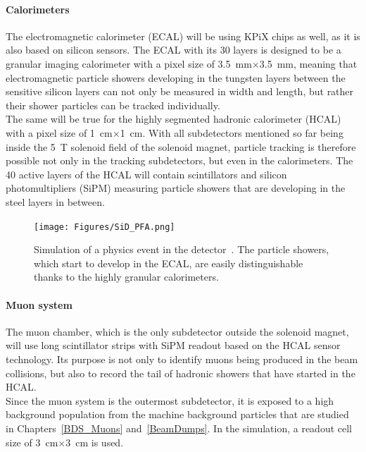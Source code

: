 \paragraph{Calorimeters}
The electromagnetic calorimeter (ECAL) will be using KPiX chips as well, as it is also based on silicon sensors.
The ECAL with its 30 layers is designed to be a granular imaging calorimeter with a pixel size of \SI{3.5}{\milli\meter}$\times$\SI{3.5}{\milli\meter}, meaning that electromagnetic particle showers developing in the tungsten layers between the sensitive silicon layers can not only be measured in width and length, but rather their shower particles can be tracked individually.
\\The same will be true for the highly segmented hadronic calorimeter (HCAL) with a pixel size of \SI{1}{\centi\meter}$\times$\SI{1}{\centi\meter}.
With all subdetectors mentioned so far being inside the \SI{5}{\tesla} solenoid field of the \sid solenoid magnet, particle tracking is therefore possible not only in the tracking subdetectors, but even in the calorimeters.
The 40 active layers of the HCAL will contain scintillators and silicon photomultipliers (SiPM) measuring particle showers that are developing in the steel layers in between.
\begin{figure}[h!]
\centering
\texttt{[image: Figures/SiD\_PFA.png]}
\caption[Visualization of the granulat \sid subdetectors]{Simulation of a physics event in the \sid detector~\cite{SiD_Update2}.
The particle showers, which start to develop in the ECAL, are easily distinguishable thanks to the highly granular calorimeters.}
\label{fig:SiD_PFA}
\end{figure}

\paragraph{Muon system}
The muon chamber, which is the only subdetector outside the solenoid magnet, will use long scintillator strips with SiPM readout based on the HCAL sensor technology.
Its purpose is not only to identify muons being produced in the beam collisions, but also to record the tail of hadronic showers that have started in the HCAL.
\\Since the muon system is the outermost subdetector, it is exposed to a high background population from the machine background particles that are studied in Chapters~\ref{BDS_Muons} and~\ref{BeamDumps}.
In the simulation, a readout cell size of \SI{3}{\centi\meter}$\times$\SI{3}{\centi\meter} is used.

